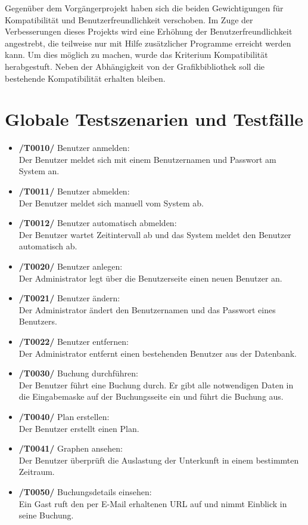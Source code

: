 \documentclass[a4paper,oneside,10pt]{scrreprt}
\begin{document}
Gegenüber dem Vorgängerprojekt haben sich die beiden Gewichtigungen 
für Kompatibilität und Benutzerfreundlichkeit verschoben. Im Zuge der 
Verbesserungen dieses Projekts wird eine Erhöhung der 
Benutzerfreundlichkeit angestrebt, die teilweise nur mit Hilfe zusätzlicher 
Programme erreicht werden kann. Um dies möglich zu machen, wurde das 
Kriterium Kompatibilität herabgestuft. Neben der Abhängigkeit von der 
Grafikbibliothek soll die bestehende Kompatibilität erhalten bleiben.


\chapter{Globale Testszenarien und Testfälle}

\begin{itemize}
\item \textbf{/T0010/} Benutzer anmelden: \\
Der Benutzer meldet sich mit einem Benutzernamen und Passwort am System an.

\item \textbf{/T0011/} Benutzer abmelden: \\
Der Benutzer meldet sich manuell vom System ab.

\item \textbf{/T0012/} Benutzer automatisch abmelden: \\
Der Benutzer wartet Zeitintervall ab und das System meldet den Benutzer automatisch ab.

\item \textbf{/T0020/} Benutzer anlegen: \\
Der Administrator legt über die Benutzerseite einen neuen Benutzer an.

\item \textbf{/T0021/} Benutzer ändern: \\
Der Administrator ändert den Benutzernamen und das Passwort eines Benutzers.

\item \textbf{/T0022/} Benutzer entfernen: \\
Der Administrator entfernt einen bestehenden Benutzer aus der Datenbank.

\item \textbf{/T0030/} Buchung durchführen: \\
Der Benutzer führt eine Buchung durch. Er gibt alle notwendigen Daten in die Eingabemaske auf der Buchungsseite ein und führt die Buchung aus.

\item \textbf{/T0040/} Plan erstellen: \\
Der Benutzer erstellt einen Plan.

\item \textbf{/T0041/} Graphen ansehen: \\
Der Benutzer überprüft die Auslastung der Unterkunft in einem 
bestimmten Zeitraum.

\item \textbf{/T0050/} Buchungsdetails einsehen: \\
Ein Gast ruft den per E-Mail erhaltenen URL auf und nimmt Einblick in 
seine Buchung.
\end{itemize}
\end{document}
